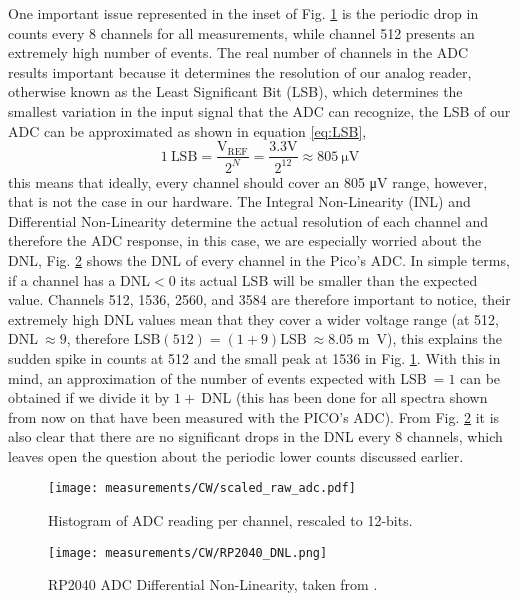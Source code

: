 One important issue represented in the inset of Fig. \ref{fig:CW_scaled} is the periodic drop in counts every 8 channels for all measurements, while channel 512 presents an extremely high number of events. The real number of channels in the ADC results important because it determines the resolution of our analog reader, otherwise known as the Least Significant Bit (LSB), which determines the smallest variation in the input signal that the ADC can recognize, the LSB of our ADC can be approximated as shown in equation \eqref{eq:LSB},
\begin{equation}\label{eq:LSB}
  1~\text{LSB} = \frac{\text{V}_\text{REF}}{2^N} = \frac{3.3 \unit{\V}}{2^{12}} \approx 805~\unit{\micro\V}
\end{equation}
this means that ideally, every channel should cover an 805 \unit{\micro\V} range, however, that is not the case in our hardware. The Integral Non-Linearity (INL) and Differential Non-Linearity determine the actual resolution of each channel and therefore the ADC response, in this case, we are especially worried about the DNL, Fig. \ref{fig:RP2040_DNL} shows the DNL of every channel in the Pico's ADC. In simple terms, if a channel has a DNL$<0$ its actual LSB will be smaller than the expected value. Channels 512, 1536, 2560, and 3584 are therefore important to notice, their extremely high DNL values mean that they cover a wider voltage range (at 512, DNL$~\approx9$, therefore LSB$(512)=(1+9)$LSB$~\approx 8.05$ \unit{\m\V}), this explains the sudden spike in counts at 512 and the small peak at 1536 in Fig. \ref{fig:CW_scaled}. With this in mind, an approximation of the number of events expected with LSB$~=1$ can be obtained if we divide it by $1+~$DNL (this has been done for all spectra shown from now on that have been measured with the PICO's ADC). From Fig. \ref{fig:RP2040_DNL} it is also clear that there are no significant drops in the DNL every 8 channels, which leaves open the question about the periodic lower counts discussed earlier.

\begin{figure}
  \centering
  \texttt{[image: measurements/CW/scaled\_raw\_adc.pdf]}
  \caption{\label{fig:CW_scaled}Histogram of ADC reading per channel, rescaled to 12-bits.}
\end{figure}

\begin{figure}
  \centering
  \texttt{[image: measurements/CW/RP2040\_DNL.png]}
  \caption{\label{fig:RP2040_DNL}RP2040 ADC Differential Non-Linearity, taken from \cite{datasheet2024rp2040}.}
\end{figure}

